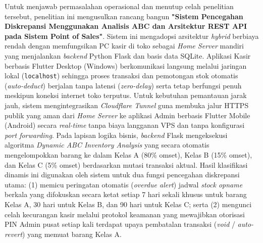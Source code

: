 \documentclass[11pt, a4paper]{article}
\begin{document}
Untuk menjawab permasalahan operasional dan menutup celah penelitian tersebut, penelitian ini mengusulkan rancang bangun \textbf{"Sistem Pencegahan Diskrepansi Menggunakan Analisis ABC dan Arsitektur REST API pada Sistem Point of Sales"}. Sistem ini mengadopsi arsitektur \textit{hybrid} berbiaya rendah dengan memfungsikan PC kasir di toko sebagai \textit{Home Server} mandiri yang menjalankan \textit{backend} Python Flask dan basis data SQLite. Aplikasi Kasir berbasis Flutter Desktop (Windows) berkomunikasi langsung melalui jaringan lokal (\texttt{localhost}) sehingga proses transaksi dan pemotongan stok otomatis (\textit{auto-deduct}) berjalan tanpa latensi (\textit{zero-delay}) serta tetap berfungsi penuh meskipun koneksi internet toko terputus. Untuk kebutuhan pemantauan jarak jauh, sistem mengintegrasikan \textit{Cloudflare Tunnel} guna membuka jalur HTTPS publik yang aman dari \textit{Home Server} ke aplikasi Admin berbasis Flutter Mobile (Android) secara \textit{real-time} tanpa biaya langganan VPS dan tanpa konfigurasi \textit{port forwarding}. Pada lapisan logika bisnis, \textit{backend} Flask mengeksekusi algoritma \textit{Dynamic ABC Inventory Analysis} yang secara otomatis mengelompokkan barang ke dalam Kelas A (80\% omset), Kelas B (15\% omset), dan Kelas C (5\% omset) berdasarkan mutasi transaksi aktual. Hasil klasifikasi dinamis ini digunakan oleh sistem untuk dua fungsi pencegahan diskrepansi utama: (1) memicu peringatan otomatis (\textit{overdue alert}) jadwal \textit{stock opname} berkala yang difokuskan secara ketat setiap 7 hari sekali khusus untuk barang Kelas A, 30 hari untuk Kelas B, dan 90 hari untuk Kelas C; serta (2) mengunci celah kecurangan kasir melalui protokol keamanan yang mewajibkan otorisasi PIN Admin pusat setiap kali terdapat upaya pembatalan transaksi (\textit{void} / \textit{auto-revert}) yang memuat barang Kelas A.
\end{document}

